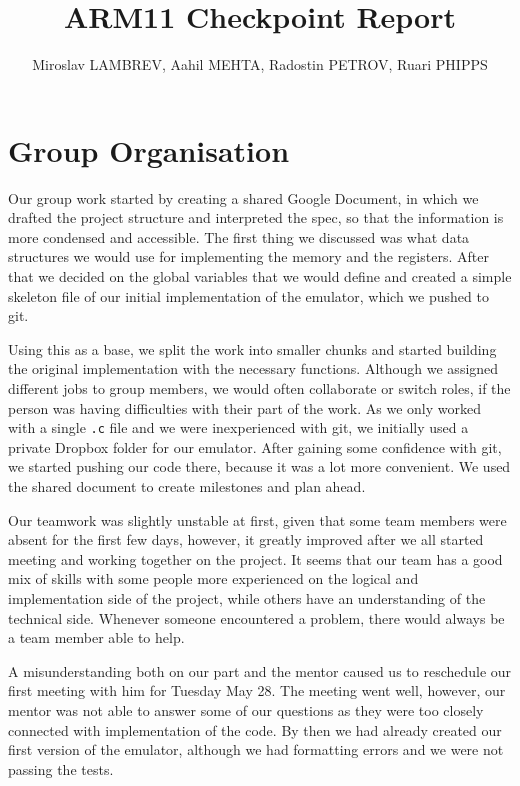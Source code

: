 \documentclass[11pt]{article}
\begin{document}
\title{\vspace{-1.5\baselineskip}ARM11 Checkpoint Report }
\author{Miroslav LAMBREV, Aahil MEHTA, Radostin PETROV, Ruari PHIPPS}

\maketitle

\section{Group Organisation}

Our group work started by creating a shared Google Document, in which we drafted the project structure and interpreted the spec, so that the information is more condensed and accessible. The first thing we discussed was what data structures we would use for implementing the memory and the registers. After that we decided on the global variables that we would define and created a simple skeleton file of our initial implementation of the emulator, which we pushed to git. \par
Using this as a base, we split the work into smaller chunks and started building the original implementation with the necessary functions. Although we assigned different jobs to group members, we would often collaborate or switch roles, if the person was having difficulties with their part of the work. As we only worked with a single \texttt{.c} file and we were inexperienced with git, we initially used a private Dropbox folder for our emulator. After gaining some confidence with git, we started pushing our code there, because it was a lot more convenient. We used the shared document to create milestones and plan ahead. \par
Our teamwork was slightly unstable at first, given that some team members were absent for the first few days, however, it greatly improved after we all started meeting and working together on the project. It seems that our team has a good mix of skills with some people more experienced on the logical and implementation side of the project, while others have an understanding of the technical side. Whenever someone encountered a problem, there would always be a team member able to help. \par
A misunderstanding both on our part and the mentor caused us to reschedule our first meeting with him for Tuesday May 28. The meeting went well, however, our mentor was not able to answer some of our questions as they were too closely connected with implementation of the code. By then we had already created our first version of the emulator, although we had formatting errors and we were not passing the tests.
\end{document}
